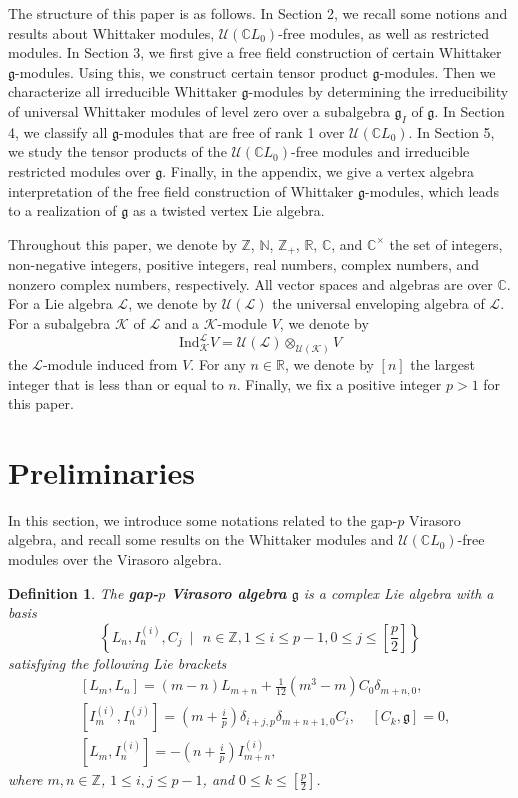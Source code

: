 \documentclass[12pt, reqno]{amsart}
\numberwithin{equation}{section}
\newtheorem{definition}[theorem]{Definition}
\numberwithin{equation}{section}
\def\dt{\delta}
\def\g{\mathfrak{g}}
\def\gi{\g_I}
\def\U{\mathcal{U}}
\newcommand{\C}{\mathbb C}
\newcommand{\R}{\mathbb{R}}
\newcommand{\N}{\mathbb{N}}
\newcommand{\Z}{\mathbb{Z}}
\newcommand{\elei}[2]{I_{#1}^{(#2)}}
\begin{document}
The structure of this paper is as follows.
In Section 2, we recall some notions and results about Whittaker modules, $\U(\C L_0)$-free modules, as well as
restricted modules.
In Section 3, we first give a free field construction of certain Whittaker $\g$-modules. Using this, we construct certain tensor product $\g$-modules.
Then we characterize all irreducible Whittaker $\g$-modules by determining the irreducibility of universal Whittaker modules of level zero over a subalgebra $\gi$ of $\g$.
In Section 4, we classify all $\g$-modules that are free of rank 1 over $\U(\C L_0)$.
In Section 5, we study the tensor products of the $\U(\C L_0)$-free modules and irreducible restricted modules over $\g$.
Finally, in the appendix, we give a vertex algebra interpretation of the free field construction of Whittaker $\g$-modules, which leads to a realization of $\g$ as a twisted vertex Lie algebra.



Throughout this paper, we denote by $\Z$, $\N$, $\Z_+$, $\mathbb R,\,\C$, and $\C^\times$ the set of integers, non-negative integers, positive integers, real numbers, complex numbers, and nonzero complex numbers,  respectively.
All vector spaces and algebras are  over $\C$.
For a Lie algebra $\mathcal L$, we denote by $\U(\mathcal L)$ the universal enveloping algebra of $\mathcal L$.
For a subalgebra $\mathcal K$  of $\mathcal L$ and  a $\mathcal K$-module $V$,
we  denote by  \[\text{Ind}_{\mathcal K}^{\mathcal L}V=\U(\mathcal L)\otimes_{\U(\mathcal K)}V\] the $\mathcal L$-module induced from $V$.
For any $n\in\R$, we denote by $[n]$ the largest integer that is less than or equal to $n$.
Finally, we fix a positive integer $p>1$ for this paper.







\section{Preliminaries}
 In this section, we introduce some notations related to the gap-$p$ Virasoro algebra, and recall some results on the  Whittaker modules and $\U(\C L_0)$-free modules over the Virasoro algebra.

\begin{definition}
The \textbf{gap-$p$ Virasoro algebra} $\g$ is a complex Lie algebra with a basis
$$\left\{L_n,\elei ni, C_j\ \mid\ \, n\in\Z, 1\leq i\leq p-1, 0\leq j\leq [\frac p2] \right\}$$
satisfying the following Lie brackets
\begin{align}
  &[L_m,L_n]=(m-n)L_{m+n}+\frac1{12}(m^3-m)C_0\dt_{m+n,0},              \label{eq2.1}\\
  &[\elei mi,\elei nj]=\left(m+\frac ip\right)\dt_{i+j,p}\dt_{m+n+1,0} C_i,\ \ \ \ \
                                               [C_k, \g]=0,             \label{eq2.2}\\
  &[L_m,\elei ni]=-\left(n+\frac ip\right)\elei{m+n}i,                   \label{eq2.3}
\end{align}
where $m,n\in\Z$, $1\leq i,j\leq p-1$, and $0\leq k\leq [\frac p2]$.
\end{definition}
\end{document}
